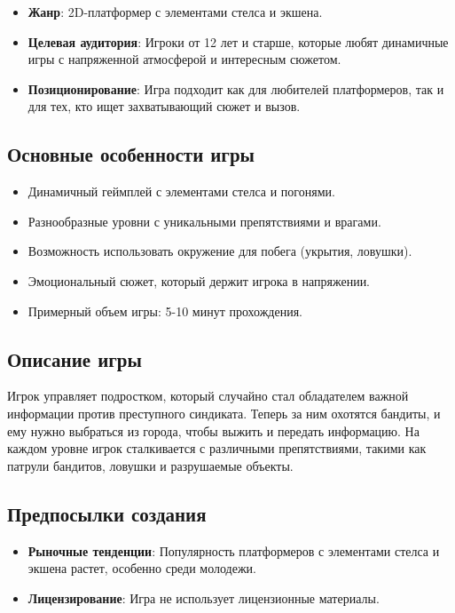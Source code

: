 \documentclass[a4paper,12pt]{article}
\begin{document}
\begin{itemize}
    \item \textbf{Жанр}: 2D-платформер с элементами стелса и экшена.
    \item \textbf{Целевая аудитория}: Игроки от 12 лет и старше, которые любят динамичные игры с напряженной атмосферой и интересным сюжетом.
    \item \textbf{Позиционирование}: Игра подходит как для любителей платформеров, так и для тех, кто ищет захватывающий сюжет и вызов.
\end{itemize}

\subsection{Основные особенности игры}

\begin{itemize}
    \item Динамичный геймплей с элементами стелса и погонями.
    \item Разнообразные уровни с уникальными препятствиями и врагами.
    \item Возможность использовать окружение для побега (укрытия, ловушки).
    \item Эмоциональный сюжет, который держит игрока в напряжении.
    \item Примерный объем игры: 5-10 минут прохождения.
\end{itemize}

\subsection{Описание игры}

Игрок управляет подростком, который случайно стал обладателем важной информации против преступного синдиката. Теперь за ним охотятся бандиты, и ему нужно выбраться из города, чтобы выжить и передать информацию. На каждом уровне игрок сталкивается с различными препятствиями, такими как патрули бандитов, ловушки и разрушаемые объекты.

\subsection{Предпосылки создания}

\begin{itemize}
    \item \textbf{Рыночные тенденции}: Популярность платформеров с элементами стелса и экшена растет, особенно среди молодежи.
    \item \textbf{Лицензирование}: Игра не использует лицензионные материалы.
\end{itemize}
\end{document}
